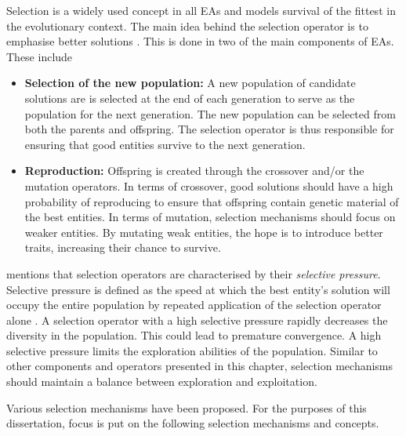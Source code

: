 Selection is a widely used concept in all \acp{EA} and models survival of the fittest in the evolutionary context. The main idea behind the selection operator is to emphasise better solutions \cite{ref:engelbrecht:2007}. This is done in two of the main components of \acp{EA}. These include

\begin{itemize}
    \item \textbf{Selection of the new population: } A new population of candidate solutions are is selected at the end of each generation to serve as the population for the next generation. The new population can be selected from both the parents and offspring. The selection operator is thus responsible for ensuring that good entities survive to the next generation.
    
    \item \textbf{Reproduction: } Offspring is created through the crossover and/or the mutation operators. In terms of crossover, good solutions should have a high probability of reproducing to ensure that offspring contain genetic material of the best entities. In terms of mutation, selection mechanisms should focus on weaker entities. By mutating weak entities, the hope is to introduce better traits, increasing their chance to survive. 
\end{itemize}

\citeauthor{ref:engelbrecht:2007}\cite{ref:engelbrecht:2007} mentions that selection operators are characterised by their \textit{selective pressure}. Selective pressure is defined as the speed at which the best entity's solution will occupy the entire population by repeated application of the selection operator alone \cite{ref:back:1994}. A selection operator with a high selective pressure rapidly decreases the diversity in the population. This could lead to premature convergence. A high selective pressure limits the exploration abilities of the population. Similar to other components and operators presented in this chapter, selection mechanisms should maintain a balance between exploration and exploitation.

Various selection mechanisms have been proposed. For the purposes of this dissertation, focus is put on the following selection mechanisms and concepts.


